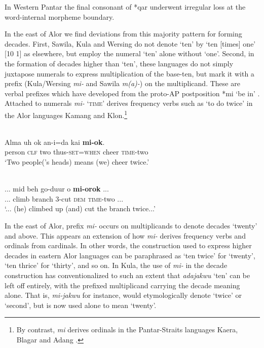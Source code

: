 \begin{table}
{\dag}In Western Pantar the final consonant of *qar underwent irregular loss at the word-internal morpheme boundary.

\end{table}


In the east of Alor we find deviations from this majority pattern for forming decades. First, Sawila, Kula and Wersing do not denote `ten' by `ten [times] one' [10 1] as elsewhere, but employ the numeral `ten' alone without `one'. Second, in the formation of decades higher than `ten', these languages do not simply juxtapose numerals to express multiplication of the base-ten, but mark it with a prefix (Kula/Wersing \textit{mi-} and Sawila \textit{m(a)-}) on the multiplicand. These are verbal prefixes which have developed from the proto-AP postposition *mi `be in' \citep{HoltonRobinsonTVhistory}. Attached to numerals  \textit{mi-} \textsc{`time'} derives frequency verbs such as `to do twice' in the Alor languages Kamang and Klon.\footnote{By contrast, \textit{mi} derives ordinals in the Pantar-Straits languages Kaera, Blagar and Adang \citep{KlamerSchapperCorbettTVnumeralwords}.}   



\ea%
\label{ex:6:13}
\\
\gll  Alma    uh    ok    an-i{\ng}=da{\ng}    kai    \textbf{mi-ok}.\\
     person  \textsc{clf}  two  thus-\textsc{set=when}  cheer  \textsc{time}{}-two  \\
\glt `Two people('s heads) means (we) cheer twice.'
\z

  







\ea%
\label{ex:6:14}
\\
\gll   ... mid  beh     go-duur  o  \textbf{mi-orok} ...\\
      ... climb  branch    3-cut    \textsc{dem}  \textsc{time}{}-two ... \\
\glt `... (he) climbed up (and) cut the branch twice...'
\z



 



In the east of Alor, prefix \textit{mi-} occurs on multiplicands to denote decades `twenty' and above. This appears an extension of how \textit{mi-}\textsc{} derives frequency verbs and ordinals from cardinals. In other words, the construction used to express higher decades in eastern Alor languages can be paraphrased as `ten twice'  for `twenty', `ten thrice'   for `thirty', and so on. In Kula, the use of \textit{mi-} in the decade construction has conventionalized to such an extent that \textit{adajakwu} `ten' can be left off entirely, with the prefixed multiplicand carrying the decade meaning alone. That is, \textit{mi-jakwu} for instance, would etymologically denote `twice' or `second', but is now used alone to mean `twenty'.


